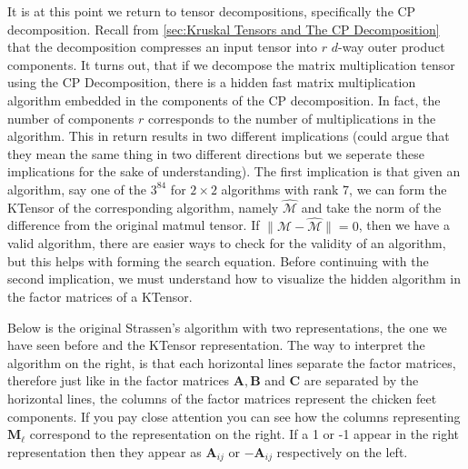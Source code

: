     It is at this point we return to tensor decompositions, specifically the CP
    decomposition. Recall from \ref{sec:Kruskal Tensors and The CP
    Decomposition} that the decomposition compresses an input tensor into $r$
    $d$-way outer product components. It turns out, that if we decompose the
    matrix multiplication tensor using the CP Decomposition, there is a hidden
    fast matrix multiplication algorithm embedded in the components of the CP
    decomposition. In fact, the number of components $r$ corresponds to the
    number of multiplications in the algorithm. This in return results in two
    different implications (could argue that they mean the same thing in two
    different directions but we seperate these implications for the sake of
    understanding). The first implication is that given an algorithm, say one of
    the $3^84$ for $2\times 2$ algorithms with rank 7, we can form the KTensor
    of the corresponding algorithm, namely $\mathcal{\hat{M}}$ and take the norm
    of the difference from the original matmul tensor. If $\|\mathcal{M -
    \hat{M}}\| = 0$, then we have a valid algorithm, there are easier ways to
    check for the validity of an algorithm, but this helps with forming the
    search equation. Before continuing with the second implication, we must
    understand how to visualize the hidden algorithm in the factor matrices of
    a KTensor. 
    
    Below is the original Strassen's algorithm with two representations, the one
    we have seen before and the KTensor representation. The way to interpret the
    algorithm on the right, is that each horizontal lines separate the factor
    matrices, therefore just like in  the factor matrices
    $\mathbf{A}, \mathbf{B}$ and $\mathbf{C}$ are separated by the horizontal
    lines, the columns of the factor matrices represent the chicken feet
    components. If you pay close attention you can see how the columns
    representing $\mathbf{M}_\ell$ correspond to the representation on the
    right. If a 1 or -1 appear in the right representation then they appear as
    $\mathbf{A}_{ij}$ or $\mathbf{-A}_{ij}$ respectively on the left.

